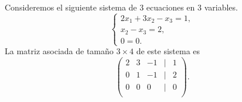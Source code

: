 \documentclass[12pt,a4paper]{book}
\begin{document}
    \begin{ejemplo}
    \label{ej:5}
        Consideremos el siguiente sistema de 3 ecuaciones en 3 variables.
        \begin{equation*}
            \begin{cases}
                2x_{1} + 3x_{2} - x_{3} = 1,\\
                x_{2} - x_{3} = 2,\\
                0 = 0.
            \end{cases}
        \end{equation*}
        La matriz asociada de tamaño $3 \times 4$ de este sistema es
        \begin{equation*}
            \begin{pmatrix}
                2 & 3 & -1 & | & 1\\
                0 & 1 & -1 & | & 2\\
                0 & 0 & 0 & | & 0\\
            \end{pmatrix}.
        \end{equation*}
    \end{ejemplo}
\end{document}
